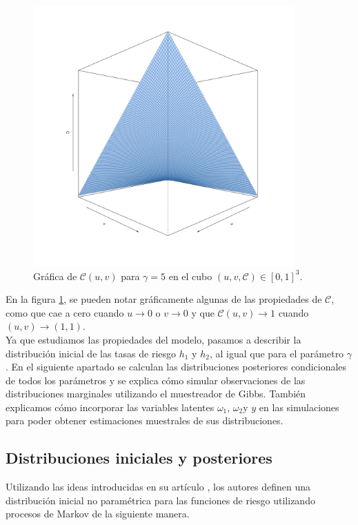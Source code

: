 \documentclass[11pt,a4paper]{article}
\newcommand{\C}{\mathcal{C}}
\begin{document}
\begin{figure}[H]
\centering\includegraphics[width=10cm]{copula_5.png}
\caption{Gráfica de $\C (u, v)$ para $\gamma = 5$ en el cubo $(u, v, \C) \in [0, 1]^3$.}
\label{fig:copula}
\end{figure}

En la figura \ref{fig:copula}, se pueden notar gráficamente algunas de las propiedades de $\C$, como que cae a cero cuando $u \to 0$ o $v \to 0$ y que $\C (u, v) \to 1$ cuando $(u, v) \to (1, 1)$.\\

Ya que estudiamos las propiedades del modelo, pasamos a describir la distribución inicial de las tasas de riesgo $h_1$ y $h_2$, al igual que para el parámetro $\gamma$. En el siguiente apartado se calculan las distribuciones posteriores condicionales de todos los parámetros y se explica cómo simular observaciones de las distribuciones marginales utilizando el muestreador de Gibbs. También explicamos cómo incorporar las variables latentes $\omega_1$, $\omega_2$y $y$ en las simulaciones para poder obtener estimaciones muestrales de sus distribuciones.

\subsection{Distribuciones iniciales y posteriores}

Utilizando las ideas introducidas en su artículo \citet{old_nieto}, los autores definen una distribución inicial no paramétrica para las funciones de riesgo utilizando procesos de Markov de la siguiente manera.\\
\end{document}
